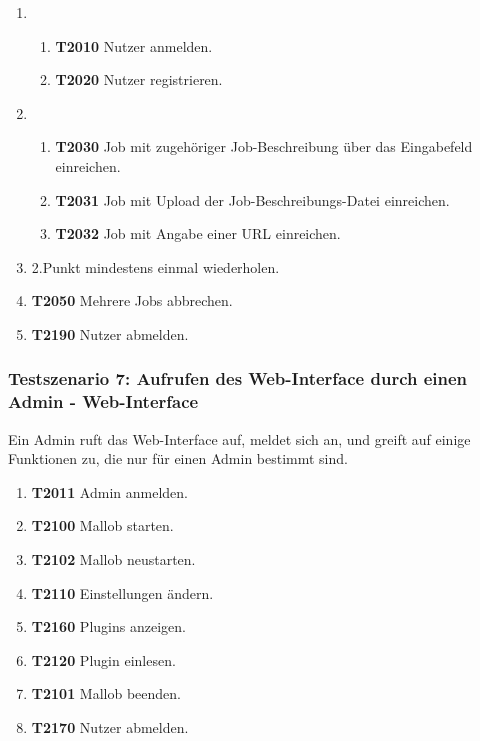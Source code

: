\begin{enumerate}
     \item 
     \begin{enumerate}
        \item \textbf{T2010} Nutzer anmelden.
        
        \item \textbf{T2020} Nutzer registrieren.
     \end{enumerate}
     
     \item 
     \begin{enumerate}
        \item \textbf{T2030} Job mit zugehöriger Job-Beschreibung über das Eingabefeld einreichen.
        
        \item \textbf{T2031} Job mit Upload der Job-Beschreibungs-Datei einreichen.
        
        \item \textbf{T2032} Job mit Angabe einer URL einreichen.
     \end{enumerate}
     
     \item 2.Punkt mindestens einmal wiederholen.
     
     \item \textbf{T2050} Mehrere Jobs abbrechen.
     
     \item \textbf{T2190} Nutzer abmelden.
\end{enumerate}

\subsubsection{Testszenario 7: Aufrufen des Web-Interface durch einen Admin - Web-Interface}
Ein Admin ruft das Web-Interface auf, meldet sich an, und greift auf einige Funktionen zu, die nur für einen Admin bestimmt sind.

\begin{enumerate}
    \item \textbf{T2011} Admin anmelden.
    
    \item \textbf{T2100} Mallob starten.
    
    \item \textbf{T2102} Mallob neustarten.
    
    \item \textbf{T2110} Einstellungen ändern.
    
    \item \textbf{T2160} Plugins anzeigen.
    
    \item \textbf{T2120} Plugin einlesen.

    \item \textbf{T2101} Mallob beenden.
    
    \item \textbf{T2170} Nutzer abmelden.
\end{enumerate}

